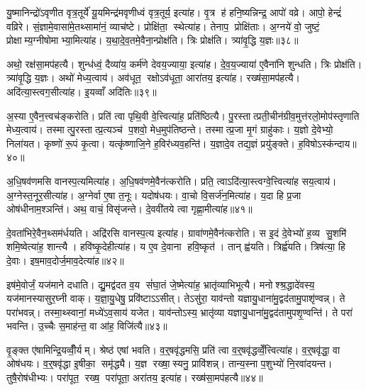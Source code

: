यु॒ष्मानिन्द्रो॑ऽवृणीत वृत्र॒तूर्ये॑ यू॒यमिन्द्र॑मवृणीध्वं वृत्र॒तूर्य॒ इत्या॑ह। वृ॒त्र ह॑ हनि॒ष्यन्निन्द्र॒ आपो॑ वव्रे। आपो॒ हेन्द्रं॑ वव्रिरे। सं॒ज्ञामे॒वासा॑मे॒तथ्सामा॑नं॒ व्याच॑ष्टे। प्रोक्षि॑ता॒ स्थेत्या॑ह। तेनाप॒ प्रोक्षि॑ताः। अ॒ग्नये॑ वो॒ जुष्टं॒ प्रोक्षाम्य॒ग्नीषोमाभ्या॒मित्या॑ह। य॒था॒दे॒व॒तमे॒वैना॒न्प्रोक्ष॑ति। त्रिः प्रोक्ष॑ति। त्र्या॑वृ॒द्धि य॒ज्ञः॥३८॥

अथो॒ रक्ष॑सा॒मप॑हत्यै। शुन्ध॑ध्वं॒ दैव्या॑य॒ कर्म॑णे देवय॒ज्याया॒ इत्या॑ह। दे॒व॒य॒ज्याया॑ ए॒वैना॑नि शुन्धति। त्रिः प्रोक्ष॑ति। त्र्या॑वृ॒द्धि य॒ज्ञः। अथो॑ मेध्य॒त्वाय॑। अव॑धूत॒ रक्षोऽव॑धूता॒ आरा॑तय॒ इत्या॑ह। रख्ष॑सा॒मप॑हत्यै। अदि॑त्या॒स्त्वग॒सीत्या॑ह। इ॒यव्वाँ अदि॑तिः॥३९॥

अ॒स्या ए॒वैन॒त्त्वच॑ङ्करोति। प्रति॑ त्वा पृथि॒वी वे॒त्त्वित्या॑ह॒ प्रति॑ष्ठित्यै। पु॒रस्तात्प्रती॒चीन॑ग्रीव॒मुत्त॑रलो॒मोप॑स्तृणाति मेध्य॒त्वाय॑। तस्मात्पु॒रस्तात्प्र॒त्यञ्च॑ प॒शवो॒ मेध॒मुप॑तिष्ठन्ते। तस्मात्प्र॒जा मृ॒गं ग्राहु॑काः। य॒ज्ञो दे॒वेभ्यो॒ निला॑यत। कृष्णो॑ रू॒पं कृ॒त्वा। यत्कृ॑ष्णाजि॒ने ह॒विर॑ध्यव॒हन्ति॑। य॒ज्ञादे॒व तद्य॒ज्ञं प्रयु॑ङ्क्ते। ह॒विषोऽस्क॑न्दाय॥४०॥

अ॒धि॒षव॑णमसि वानस्प॒त्यमित्या॑ह। अ॒धि॒षव॑णमे॒वैन॑त्करोति। प्रति॒ त्वाऽदि॑त्या॒स्त्वग्वे॒त्त्वित्या॑ह सय॒त्वाय॑। अ॒ग्नेस्त॒नूर॒सीत्या॑ह। अ॒ग्नेर्वा ए॒षा त॒नूः। यदोष॑धयः। वा॒चो वि॒सर्ज॑न॒मित्या॑ह। य॒दा हि प्र॒जा ओष॑धीनाम॒श्ञन्ति॑। अथ॒ वाचं॒ विसृ॑जन्ते। दे॒ववी॑तये त्वा गृह्णा॒मीत्या॑ह॥४१॥

दे॒वता॑भिरे॒वैन॒थ्सम॑र्धयति। अद्रि॑रसि वानस्प॒त्य इत्या॑ह। ग्रावा॑णमे॒वैन॑त्करोति। स इ॒दं दे॒वेभ्यो॑ ह॒व्य सु॒शमि॑ शमि॒ष्वेत्या॑ह॒ शान्त्यै। हवि॑ष्कृ॒देहीत्या॑ह। य ए॒व दे॒वाना हवि॒ष्कृत॑। तान्‌ ह्व॑यति। त्रिर्ह्व॑यति। त्रिष॑त्या॒ हि दे॒वाः। इष॒माव॒दोर्ज॒माव॒देत्या॑ह॥४२॥

इष॑मे॒वोर्जं॒ यज॑माने दधाति। द्यु॒मद्व॑दत व॒य सं॑घा॒तं जे॒ष्मेत्या॑ह॒ भ्रातृ॑व्याभिभूत्यै। मनोश्श्र॒द्धादे॑वस्य॒ यज॑मानस्यासुर॒घ्नी वाक्। य॒ज्ञा॒यु॒धेषु॒ प्रवि॑ष्टाऽऽसीत्। तेऽसु॑रा॒ याव॑न्तो यज्ञायु॒धाना॑मु॒द्वद॑तामु॒पाशृ॑ण्वन्न्। ते परा॑भवन्न्। तस्मा॒थ्स्वानां॒ मध्ये॑ऽव॒साय॑ यजेत। याव॑न्तोऽस्य॒ भ्रातृ॑व्या यज्ञायु॒धाना॑मु॒द्वद॑तामुपशृ॒ण्वन्ति॑। ते परा॑ भवन्ति। उ॒च्चैः स॒माह॑न्त॒ वा आ॑ह॒ विजि॑त्यै॥४३॥

वृ॒ङ्क्त ए॑षामिन्द्रि॒यव्वीँ॒र्यम्। श्रेष्ठ॑ एषां भवति। व॒र्\mbox{}॒षवृ॑द्धमसि॒ प्रति॑ त्वा व॒र्\mbox{}॒षवृ॑द्धव्वेँ॒त्त्वित्या॑ह। व॒र्\mbox{}॒षवृ॑द्धा॒ वा ओष॑धयः। व॒र्\mbox{}॒षवृ॑द्धा इ॒षीका॒ समृ॑द्ध्यै। य॒ज्ञ रख्षा॒स्यनु॒ प्रावि॑शन्न्। तान्य॒स्ना प॒शुभ्यो॑ नि॒रवा॑दयन्त। तुषै॒रोष॑धीभ्यः। परा॑पूत॒ रख्ष॒ परा॑पूता॒ अरा॑तय॒ इत्या॑ह। रख्ष॑सा॒मप॑हत्यै॥४४॥

